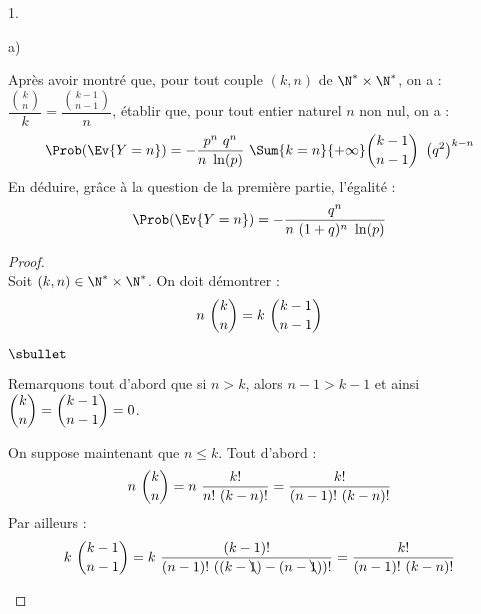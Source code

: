 \documentclass[11pt]{article}%
\begin{document}
\begin{noliste}{1.}
\begin{noliste}{a)}
  \item Après avoir montré que, pour tout couple $(k,n)$ de $\N^*
    \times \N^*$, on a : $\dfrac{\binom{k}{n}}{k} =
    \dfrac{\binom{k-1}{n-1}}{n}$, établir que, pour tout entier
    naturel $n$ non nul, on a :
    \[
    \Prob(\Ev{Y = n}) = -\dfrac{p^{n} \ q^{n}}{n \ \ln(p)} \ \Sum{k =
      n}{+ \infty} \dbinom{k-1}{n-1} \ \left(q^{2} \right)^{k-n}
    \]
    En déduire, grâce à la question  de la première partie,
    l'égalité :
    \[
    \Prob(\Ev{Y = n}) = -\dfrac{q^{n}}{n \ (1 + q)^{n} \ \ln(p)}
    \]

    \begin{proof}~\\%
      Soit $(k, n) \in \N^* \times \N^*$. On doit démontrer :
        \[
        n \ \dbinom{k}{n} = k \ \dbinom{k-1}{n-1}
        \]
      \begin{noliste}{$\sbullet$}
      \item Remarquons tout d'abord que si $n > k$, alors $n-1 > k-1$
        et ainsi $\dbinom{k}{n} = \dbinom{k-1}{n-1} = 0$.




      \item On suppose maintenant que $n \leq k$. Tout d'abord :
        \[
        n \ \dbinom{k}{n} = n \ \dfrac{k!}{n! \ (k-n)!} =
        \dfrac{k!}{(n-1)! \ (k-n)!}
        \]
        Par ailleurs : 
        \[
        k \ \dbinom{k-1}{n-1} = k \ \dfrac{(k-1)!}{(n-1)! \
          ((k-\bcancel{1})-(n-\bcancel{1}))!} = \dfrac{k!}{(n-1)! \
          (k-n)!}
        \]


\end{noliste}
\end{proof}
\end{noliste}
\end{noliste}
\end{document}
